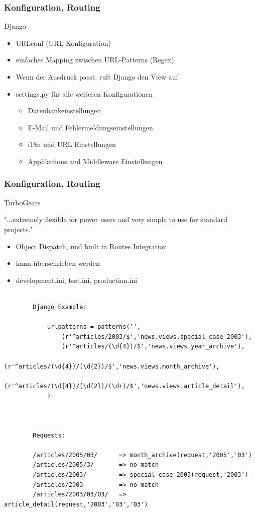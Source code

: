 \documentclass[
    t,
    smaller,
    compress,
]{beamer}
\begin{document}
\begin{frame}
  \frametitle{Konfiguration, Routing}
	Django
  	\begin{itemize}[<1->]
    	\item URLconf (URL Konfiguration)
    	\item einfaches Mapping zwischen URL-Patterns (Regex)
    	\item Wenn der Ausdruck passt, ruft Django den View auf
    	\item settings.py für alle weiteren Konfigurationen
    	\begin{itemize}[<1->]
    		\item Datenbankeinstellungen
    		\item E-Mail und Fehlermeldungseinstellungen
    		\item i18n und URL Einstellungen
    		\item Applikations and Middleware Einstellungen
    	\end{itemize}
  	 \end{itemize}
  	 
\end{frame}


\begin{frame}
  \frametitle{Konfiguration, Routing}
TurboGears

"...extremely flexible for power users and very simple to use for standard projects."

  	 \begin{itemize}[<1->]
    	\item Object Dispatch, und built in Routes Integration
    	\item kann überschrieben werden
    	\item development.ini, test.ini, production.ini
    	
 	\end{itemize}
\end{frame}  


	\begin{verbatim}
		
		Django Example:
	
			urlpatterns = patterns('',
				(r'^articles/2003/$','news.views.special_case_2003'),
				(r'^articles/(\d{4})/$','news.views.year_archive'),
				(r'^articles/(\d{4})/(\d{2})/$','news.views.month_archive'),
				(r'^articles/(\d{4})/(\d{2})/(\d+)/$','news.views.article_detail'),
			)
		
		
		
		Requests:
	
		/articles/2005/03/		=> month_archive(request,'2005','03')
		/articles/2005/3/		=> no match
		/articles/2003/			=> special_case_2003(request,'2003')
		/articles/2003			=> no match
		/articles/2003/03/03/	=> article_detail(request,'2003','03','03')
		
	\end{verbatim}
	
\end{document}
